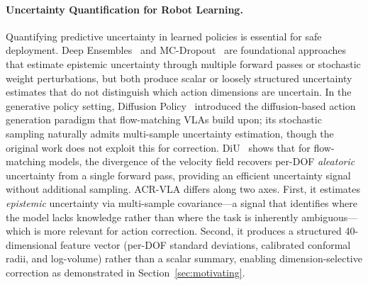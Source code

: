\paragraph{Uncertainty Quantification for Robot Learning.}
Quantifying predictive uncertainty in learned policies is essential for safe deployment.
Deep Ensembles~\cite{lakshminarayanan2017ensembles} and MC-Dropout~\cite{gal2016dropout} are foundational approaches that estimate epistemic uncertainty through multiple forward passes or stochastic weight perturbations, but both produce scalar or loosely structured uncertainty estimates that do not distinguish which action dimensions are uncertain.
In the generative policy setting, Diffusion Policy~\cite{chi2023diffusion_policy} introduced the diffusion-based action generation paradigm that flow-matching VLAs build upon; its stochastic sampling naturally admits multi-sample uncertainty estimation, though the original work does not exploit this for correction.
DiU~\cite{xing2026diu} shows that for flow-matching models, the divergence of the velocity field recovers per-DOF \emph{aleatoric} uncertainty from a single forward pass, providing an efficient uncertainty signal without additional sampling.
ACR-VLA differs along two axes.
First, it estimates \emph{epistemic} uncertainty via multi-sample covariance---a signal that identifies where the model lacks knowledge rather than where the task is inherently ambiguous---which is more relevant for action correction.
Second, it produces a structured 40-dimensional feature vector (per-DOF standard deviations, calibrated conformal radii, and log-volume) rather than a scalar summary, enabling dimension-selective correction as demonstrated in Section~\ref{sec:motivating}.

